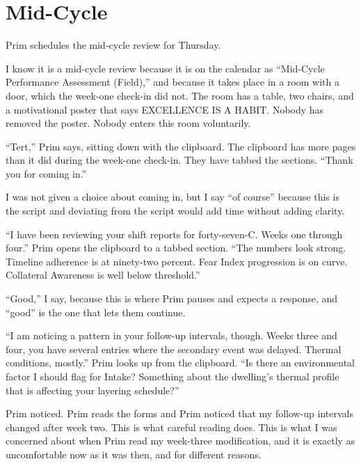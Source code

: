 
\chapter{Mid-Cycle}

Prim schedules the mid-cycle review for Thursday.

I know it is a mid-cycle review because it is on the calendar as ``Mid-Cycle Performance Assessment (Field),'' and because it takes place in a room with a door, which the week-one check-in did not. The room has a table, two chairs, and a motivational poster that says EXCELLENCE IS A HABIT. Nobody has removed the poster. Nobody enters this room voluntarily.

``Tert,'' Prim says, sitting down with the clipboard. The clipboard has more pages than it did during the week-one check-in. They have tabbed the sections. ``Thank you for coming in.''

I was not given a choice about coming in, but I say ``of course'' because this is the script and deviating from the script would add time without adding clarity.

``I have been reviewing your shift reports for forty-seven-C. Weeks one through four.'' Prim opens the clipboard to a tabbed section. ``The numbers look strong. Timeline adherence is at ninety-two percent. Fear Index progression is on curve. Collateral Awareness is well below threshold.''

``Good,'' I say, because this is where Prim pauses and expects a response, and ``good'' is the one that lets them continue.

``I am noticing a pattern in your follow-up intervals, though. Weeks three and four, you have several entries where the secondary event was delayed. Thermal conditions, mostly.'' Prim looks up from the clipboard. ``Is there an environmental factor I should flag for Intake? Something about the dwelling's thermal profile that is affecting your layering schedule?''

Prim noticed. Prim reads the forms and Prim noticed that my follow-up intervals changed after week two. This is what careful reading does. This is what I was concerned about when Prim read my week-three modification, and it is exactly as uncomfortable now as it was then, and for different reasons.

